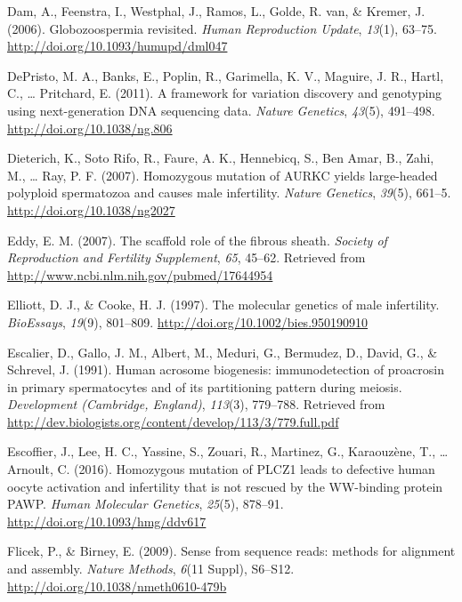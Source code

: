 \documentclass[12pt,twoside]{reedthesis}
\theoremstyle{definition}
\theoremstyle{definition}
\theoremstyle{remark}
\begin{document}
  \hypertarget{ref-Dam2006}{}
  Dam, A., Feenstra, I., Westphal, J., Ramos, L., Golde, R. van, \&
  Kremer, J. (2006). Globozoospermia revisited. \emph{Human Reproduction
  Update}, \emph{13}(1), 63--75.
  \url{http://doi.org/10.1093/humupd/dml047}
  
  \hypertarget{ref-DePristo2011}{}
  DePristo, M. A., Banks, E., Poplin, R., Garimella, K. V., Maguire, J.
  R., Hartl, C., \ldots{} Pritchard, E. (2011). A framework for variation
  discovery and genotyping using next-generation DNA sequencing data.
  \emph{Nature Genetics}, \emph{43}(5), 491--498.
  \url{http://doi.org/10.1038/ng.806}
  
  \hypertarget{ref-Dieterich2007}{}
  Dieterich, K., Soto Rifo, R., Faure, A. K., Hennebicq, S., Ben Amar, B.,
  Zahi, M., \ldots{} Ray, P. F. (2007). Homozygous mutation of AURKC
  yields large-headed polyploid spermatozoa and causes male infertility.
  \emph{Nature Genetics}, \emph{39}(5), 661--5.
  \url{http://doi.org/10.1038/ng2027}
  
  \hypertarget{ref-Eddy2007}{}
  Eddy, E. M. (2007). The scaffold role of the fibrous sheath.
  \emph{Society of Reproduction and Fertility Supplement}, \emph{65},
  45--62. Retrieved from \url{http://www.ncbi.nlm.nih.gov/pubmed/17644954}
  
  \hypertarget{ref-Elliott1997}{}
  Elliott, D. J., \& Cooke, H. J. (1997). The molecular genetics of male
  infertility. \emph{BioEssays}, \emph{19}(9), 801--809.
  \url{http://doi.org/10.1002/bies.950190910}
  
  \hypertarget{ref-Escalier1991}{}
  Escalier, D., Gallo, J. M., Albert, M., Meduri, G., Bermudez, D., David,
  G., \& Schrevel, J. (1991). Human acrosome biogenesis: immunodetection
  of proacrosin in primary spermatocytes and of its partitioning pattern
  during meiosis. \emph{Development (Cambridge, England)}, \emph{113}(3),
  779--788. Retrieved from
  \url{http://dev.biologists.org/content/develop/113/3/779.full.pdf}
  
  \hypertarget{ref-Escoffier2016}{}
  Escoffier, J., Lee, H. C., Yassine, S., Zouari, R., Martinez, G.,
  Karaouzène, T., \ldots{} Arnoult, C. (2016). Homozygous mutation of
  PLCZ1 leads to defective human oocyte activation and infertility that is
  not rescued by the WW-binding protein PAWP. \emph{Human Molecular
  Genetics}, \emph{25}(5), 878--91.
  \url{http://doi.org/10.1093/hmg/ddv617}
  
  \hypertarget{ref-Flicek2009}{}
  Flicek, P., \& Birney, E. (2009). Sense from sequence reads: methods for
  alignment and assembly. \emph{Nature Methods}, \emph{6}(11 Suppl),
  S6--S12. \url{http://doi.org/10.1038/nmeth0610-479b}
  
\end{document}
